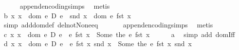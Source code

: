 \begin{isabellebody}
\ \ \ \ \isamarkupfalse%
\ append{\isacharunderscore}{\kern0pt}encoding{\isachardot}{\kern0pt}simps\ \isamarkupfalse%
\ metis\isanewline
\ \ \isamarkupfalse%
\ b{\isacharcolon}{\kern0pt}\ {\isachardoublequoteopen}{\isasymAnd}x{\isachardot}{\kern0pt}\ x\ {\isasymin}\ dom\ {\isacharparenleft}{\kern0pt}e{}\ {\isasymtimes}\isactrlsub D\ e{}{\isacharparenright}{\kern0pt}\ {\isasymLongrightarrow}\ snd\ x\ {\isasymin}\ dom\ {\isacharparenleft}{\kern0pt}e{}\ {\isacharparenleft}{\kern0pt}fst\ x{\isacharparenright}{\kern0pt}{\isacharparenright}{\kern0pt}{\isachardoublequoteclose}\isanewline
\ \ \ \ \isamarkupfalse%
\ {\isacharparenleft}{\kern0pt}simp\ add{\isacharcolon}{\kern0pt}dom{\isacharunderscore}{\kern0pt}def\ del{\isacharcolon}{\kern0pt}not{\isacharunderscore}{\kern0pt}None{\isacharunderscore}{\kern0pt}eq{\isacharparenright}{\kern0pt}\ \isanewline
\ \ \ \ \isamarkupfalse%
\ append{\isacharunderscore}{\kern0pt}encoding{\isachardot}{\kern0pt}simps\ \isamarkupfalse%
\ metis\isanewline
\ \ \isamarkupfalse%
\ c{\isacharcolon}{\kern0pt}\ {\isachardoublequoteopen}{\isasymAnd}x{\isachardot}{\kern0pt}\ x\ {\isasymin}\ dom\ {\isacharparenleft}{\kern0pt}e{}\ {\isasymtimes}\isactrlsub D\ e{}{\isacharparenright}{\kern0pt}\ {\isasymLongrightarrow}\ e{}\ {\isacharparenleft}{\kern0pt}fst\ x{\isacharparenright}{\kern0pt}\ {\isacharequal}{\kern0pt}\ Some\ {\isacharparenleft}{\kern0pt}the\ {\isacharparenleft}{\kern0pt}e{}\ {\isacharparenleft}{\kern0pt}fst\ x{\isacharparenright}{\kern0pt}{\isacharparenright}{\kern0pt}{\isacharparenright}{\kern0pt}{\isachardoublequoteclose}\isanewline
\ \ \ \ \isamarkupfalse%
\ a\ \isamarkupfalse%
\ {\isacharparenleft}{\kern0pt}simp\ add{\isacharcolon}{\kern0pt}\ domIff{\isacharparenright}{\kern0pt}\isanewline
\ \ \isamarkupfalse%
\ d{\isacharcolon}{\kern0pt}\ {\isachardoublequoteopen}{\isasymAnd}x{\isachardot}{\kern0pt}\ x\ {\isasymin}\ dom\ {\isacharparenleft}{\kern0pt}e{}\ {\isasymtimes}\isactrlsub D\ e{}{\isacharparenright}{\kern0pt}\ {\isasymLongrightarrow}\ e{}\ {\isacharparenleft}{\kern0pt}fst\ x{\isacharparenright}{\kern0pt}\ {\isacharparenleft}{\kern0pt}snd\ x{\isacharparenright}{\kern0pt}\ {\isacharequal}{\kern0pt}\ Some\ {\isacharparenleft}{\kern0pt}the\ {\isacharparenleft}{\kern0pt}e{}\ {\isacharparenleft}{\kern0pt}fst\ x{\isacharparenright}{\kern0pt}\ {\isacharparenleft}{\kern0pt}snd\ x{\isacharparenright}{\kern0pt}{\isacharparenright}{\kern0pt}{\isacharparenright}{\kern0pt}{\isachardoublequoteclose}\isanewline

\end{isabellebody}
